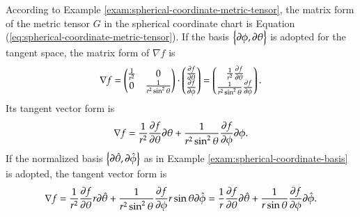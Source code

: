 \documentclass[11pt, a4paper]{book}
\begin{document}
\begin{Example}
  \label{exam:spherical-coordinate-gradient}
  According to Example \ref{exam:spherical-coordinate-metric-tensor}, the matrix form of
  the metric tensor $G$ in the spherical coordinate chart is Equation
  (\ref{eq:spherical-coordinate-metric-tensor}). If the basis
  $\left\{ \boldsymbol{\partial}\phi, \boldsymbol{\partial}\theta \right\}$ is adopted for the tangent space, the matrix form of
  $\nabla f$ is
  \begin{equation}
    \nabla f = \begin{pmatrix}
      \frac{1}{r^2} & 0 \\
      0 & \frac{1}{r^2\sin^2\theta}
    \end{pmatrix}
    \cdot
    \begin{pmatrix}
      \frac{\partial f}{\partial \theta} \\
      \frac{\partial f}{\partial \phi}
    \end{pmatrix} = \begin{pmatrix}
      \frac{1}{r^2} \frac{\partial f}{\partial \theta} \\
      \frac{1}{r^2\sin^2\theta} \frac{\partial f}{\partial \phi}
    \end{pmatrix}.
  \end{equation}
  Its tangent vector form is
  \begin{equation}
    \nabla f = \frac{1}{r^2} \frac{\partial f}{\partial \theta} \boldsymbol{\partial}\theta +
    \frac{1}{r^2\sin^2\theta} \frac{\partial f}{\partial \phi} \boldsymbol{\partial}\phi.
  \end{equation}
  If the normalized basis
  $\left\{ \boldsymbol{\partial}\hat{\theta}, \boldsymbol{\partial}\hat{\phi} \right\}$ as in Example
  \ref{exam:spherical-coordinate-basis} is adopted, the tangent vector form is
  \begin{equation}
    \nabla f = \frac{1}{r^2} \frac{\partial f}{\partial \theta} r \boldsymbol{\partial}\hat{\theta} +
    \frac{1}{r^2\sin^2\theta} \frac{\partial f}{\partial \phi} r\sin\theta
    \boldsymbol{\partial}\hat{\phi} = \frac{1}{r} \frac{\partial f}{\partial \theta}
    \boldsymbol{\partial}\hat{\theta} + \frac{1}{r\sin\theta} \frac{\partial f}{\partial \phi}
    \boldsymbol{\partial}\hat{\phi}.
  \end{equation}
\end{Example}
\end{document}
